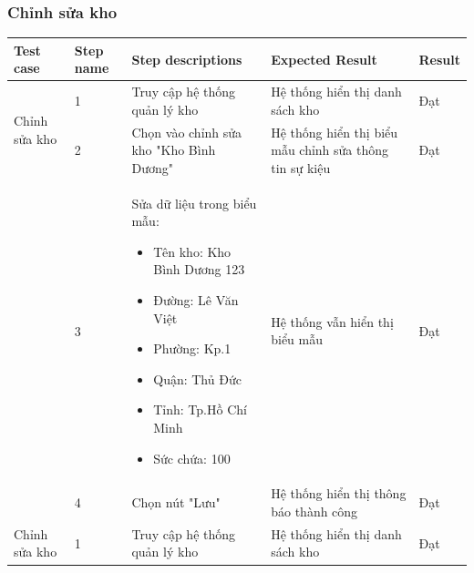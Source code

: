 \subsubsection{Chỉnh sửa kho}
{
    \setlength\extrarowheight{6pt}
    \begin{longtable}{| p{2.5cm}| p{1cm}| p{5.5cm}| p{4.5cm} | p{1.5cm} |}
        \hline
        \textbf{Test case}                    & \textbf{Step name}             & \textbf{Step descriptions}              & \textbf{Expected Result}                               & \textbf{Result} \\
        \hline
        \multirow[t]{2}{2.5cm}{Chỉnh sửa kho} & 1                              & Truy cập hệ thống quản lý kho           & Hệ thống hiển thị danh sách kho                        & Đạt             \\
        \cline{2-5}
                                              & 2                              & Chọn vào chỉnh sửa kho "Kho Bình Dương" & Hệ thống hiển thị biểu mẫu chỉnh sửa thông tin sự kiệu & Đạt             \\
        \cline{2-5}
                                              & 3                              & Sửa dữ liệu trong biểu mẫu:
        \begin{itemize}
            \item Tên kho: Kho Bình Dương 123
            \item Đường: Lê Văn Việt
            \item Phường: Kp.1
            \item Quận: Thủ Đức
            \item Tỉnh: Tp.Hồ Chí Minh
            \item Sức chứa: 100
        \end{itemize}     & Hệ thống vẫn hiển thị biểu mẫu & Đạt                                                                                                                                    \\
        \cline{2-5}
                                              & 4                              & Chọn nút "Lưu"                          & Hệ thống hiển thị thông báo thành công                 & Đạt             \\
        \hline
        \multirow[t]{2}{2.5cm}{Chỉnh sửa kho} & 1                              & Truy cập hệ thống quản lý kho           & Hệ thống hiển thị danh sách kho                        & Đạt             \\

\end{longtable}}
